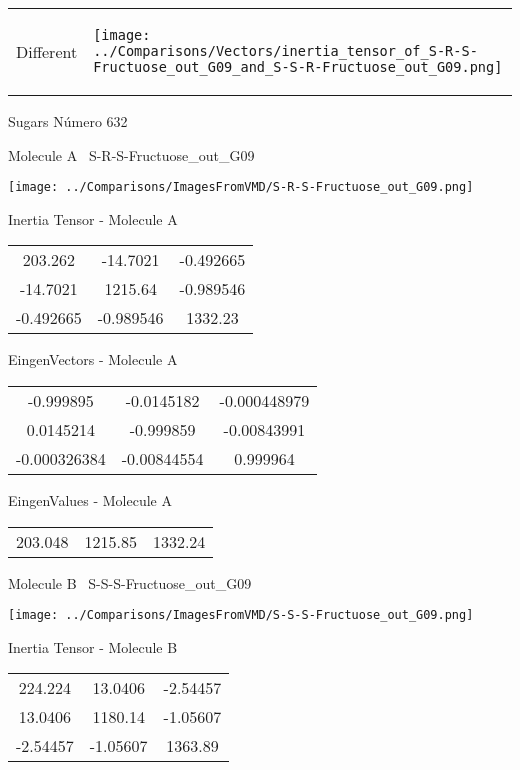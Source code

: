 \vtab[-5mm]
\begin{tabular}{*{2}{m{}}}
\begin{center}
\textcolor{NavyBlue}{\Large Different}
\end{center}
&
\begin{center}
\texttt{[image: ../Comparisons/Vectors/inertia\_tensor\_of\_S-R-S-Fructuose\_out\_G09\_and\_S-S-R-Fructuose\_out\_G09.png]}
\end{center}
\end{tabular}

 \newpage

\vtab[-3cm]
\begin{center}
{\large Sugars \tab Número 632}
\end{center}
\begin{multicols}{2}
\begin{center}

Molecule A \
S-R-S-Fructuose\_out\_G09

\texttt{[image: ../Comparisons/ImagesFromVMD/S-R-S-Fructuose\_out\_G09.png]}

Inertia Tensor - Molecule A \\
\begin{tabular}{|c c c|}
203.262	 & 	-14.7021	 & 	-0.492665	 \\
-14.7021	 & 	1215.64	 & 	-0.989546	 \\
-0.492665	 & 	-0.989546	 & 	1332.23
\end{tabular}

\vtab
 EingenVectors - Molecule A     \\
\begin{tabular}{|c c c|}
-0.999895	 & 	-0.0145182	 & 	-0.000448979	 \\
0.0145214	 & 	-0.999859	 & 	-0.00843991	 \\
-0.000326384	 & 	-0.00844554	 & 	0.999964
\end{tabular}

\vtab
 EingenValues - Molecule A     \\
\begin{tabular}{|c c c|}
203.048	 & 	1215.85	 & 	1332.24	 \\
\end{tabular}
\columnbreak

Molecule B \
S-S-S-Fructuose\_out\_G09

\texttt{[image: ../Comparisons/ImagesFromVMD/S-S-S-Fructuose\_out\_G09.png]}

Inertia Tensor - Molecule B \\
\begin{tabular}{|c c c|}
224.224	 & 	13.0406	 & 	-2.54457	 \\
13.0406	 & 	1180.14	 & 	-1.05607	 \\
-2.54457	 & 	-1.05607	 & 	1363.89
\end{tabular}


\end{center}
\end{multicols}

